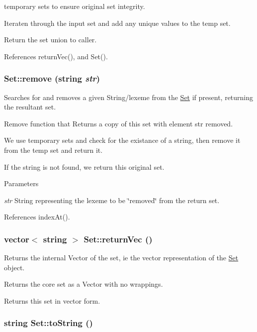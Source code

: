 temporary sets to ensure original set integrity.

Iteraten through the input set and add any unique values to the temp set.

Return the set union to caller. 



References returnVec(), and Set().

\hypertarget{classSet_aff1a2ae6ae0f3bc950b4dba2e46c645f}{
\subsubsection[{remove}]{ Set::remove (string {\em str})}}
\label{classSet_aff1a2ae6ae0f3bc950b4dba2e46c645f}


Searches for and removes a given String/lexeme from the \hyperlink{classSet}{Set} if present, returning the resultant set. 

Remove function that Returns a copy of this set with element str removed.

We use temporary sets and check for the existance of a string, then remove it from the temp set and return it.

If the string is not found, we return this original set.


\begin{DoxyParams}{Parameters}
\item[{\em str}]String representing the lexeme to be \char`\"{}removed\char`\"{} from the return set. \end{DoxyParams}


References indexAt().

\hypertarget{classSet_a380e493b3c87097ef6096be6330139b7}{
\subsubsection[{returnVec}]{\setlength{\rightskip}{0pt plus 5cm}vector$<$ string $>$ Set::returnVec ()}}
\label{classSet_a380e493b3c87097ef6096be6330139b7}


Returns the internal Vector of the set, ie the vector representation of the \hyperlink{classSet}{Set} object. 

Returns the core set as a Vector with no wrappings.

\begin{DoxyReturn}{Returns}
this set in vector form. 
\end{DoxyReturn}
\hypertarget{classSet_aa321f0090bb4f590363556e03375e9ae}{
\subsubsection[{toString}]{\setlength{\rightskip}{0pt plus 5cm}string Set::toString ()}}
\label{classSet_aa321f0090bb4f590363556e03375e9ae}


